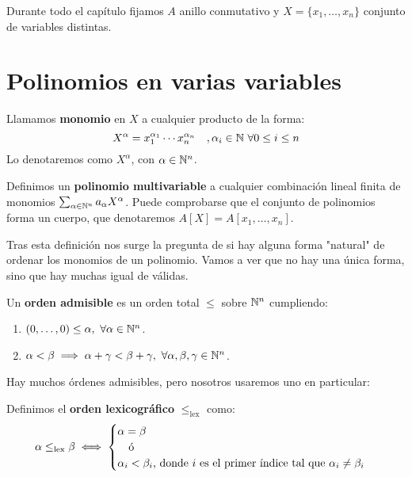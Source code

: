 
Durante todo el capítulo fijamos $A$ anillo conmutativo y $X=\{x_1, \dots, x_n\}$ conjunto de variables distintas.

\section{Polinomios en varias variables}

\begin{definicion}
  Llamamos \textbf{monomio} en $X$ a cualquier producto de la forma:
  $$X^{\alpha} = x_1^{\alpha_1} \cdots x_n^{\alpha_n}\quad, \alpha_i \in \mathbb{N}\ \forall 0\le i \le n$$
  Lo denotaremos como $X^{\alpha}$, con $\alpha\in \mathbb{N}^n$.
\end{definicion}

\begin{definicion}
  Definimos un \textbf{polinomio multivariable} a cualquier combinación lineal finita de monomios $\sum_{\alpha\in\mathbb{N}^n} a_{\alpha} X^{\alpha}$. Puede comprobarse que el conjunto de polinomios forma un cuerpo, que denotaremos $A[X] = A[x_1,\dots, x_n]$.
\end{definicion}

Tras esta definición nos surge la pregunta de si hay alguna forma "natural" de ordenar los monomios de un polinomio. Vamos a ver que no hay una única forma, sino que hay muchas igual de válidas.

\begin{definicion}
  Un \textbf{orden admisible} es un orden total $\le$ sobre $\mathbb{N}^n$ cumpliendo:
  \begin{enumerate}
    \item $(0,\dots ,0) \le \alpha,\ \forall \alpha \in \mathbb{N}^n$.
    \item $\alpha < \beta \implies \alpha + \gamma < \beta + \gamma,\ \forall \alpha,\beta,\gamma \in \mathbb{N}^n$.
  \end{enumerate}
\end{definicion}

Hay muchos órdenes admisibles, pero nosotros usaremos uno en particular:

\begin{definicion}
  Definimos el \textbf{orden lexicográfico} $\le_{\text{lex}}$ como:
  \begin{equation*}
    \alpha \le_{\text{lex}} \beta \iff \begin{cases}
      \alpha  = \beta \\
      \quad\text{ó}   \\
      \alpha_i < \beta_i \text{, donde $i$ es el primer índice tal que } \alpha_i \neq \beta_i
    \end{cases}
  \end{equation*}
\end{definicion}


